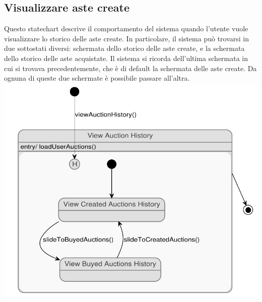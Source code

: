 \subsection{Visualizzare aste create}
\begin{center}
Questo statechart descrive il comportamento del sistema quando l'utente vuole visualizzare lo storico delle aste create. 
In particolare, il sistema può trovarsi in due sottostati diversi: schermata dello storico delle aste create, e la schermata dello storico delle aste acquistate.
Il sistema si ricorda dell'ultima schermata in cui si trovava precedentemente, che è di default la schermata delle aste create. 
Da ognuna di queste due schermate è possibile passare all'altra. 
\\
\includegraphics[width=.75\textwidth]{assets/state_charts/visualizzare_aste_create.pdf}
\end{center}
\newpage